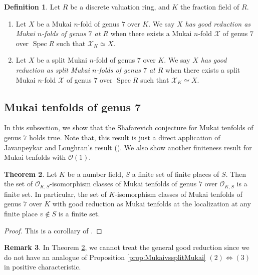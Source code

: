 \documentclass[autodetect-engine, a4paper]{amsart}
\theoremstyle{definition}
\newtheorem{thm}{Theorem}[section]
\newtheorem{rem}[thm]{Remark}
\newtheorem{defn}[thm]{Definition}
\def\cO{\mathcal{O}}
\DeclareMathOperator\Spec{\mathrm{Spec}}
\begin{document}
\begin{defn}
Let $R$ be a discrete valuation ring, and $K$ the fraction field of $R$.
\begin{enumerate}

\item 
Let $X$ be a Mukai $n$-fold of genus $7$ over $K$.
We say \emph{$X$ has good reduction as Mukai $n$-folds of genus $7$ at $R$} when there exists a Mukai $n$-fold $\mathcal{X}$ of genus $7$ over $\Spec R$ such that $\mathcal{X}_{K} \simeq X$.

\item
Let $X$ be a split Mukai $n$-fold of genus $7$ over $K$.
We say \emph{$X$ has good reduction as split Mukai $n$-folds of genus $7$ at $R$} when
there exists a split Mukai $n$-fold $\mathcal{X}$ of genus $7$ over $\Spec R$ such that $\mathcal{X}_{K} \simeq X$.

\end{enumerate}
\end{defn}



\subsection{Mukai tenfolds of genus 7}
In this subsection, we show that the Shafarevich conjecture for Mukai tenfolds of genus $7$ holds true.
Note that, this result is just a direct application of Javanpeykar and Loughran's result (\cite{Javanpeykar-Loughran:flag}).
We also show another finiteness result for Mukai tenfolds with $\cO(1)$.

\begin{thm}
\label{thm:Mukai10shaf}
Let $K$ be a number field, $S$ a finite set of finite places of $S$.
Then the set of $\cO_{K,S}$-isomorphism classes of Mukai tenfolds of genus $7$ over $\cO_{K,S}$ is a finite set.
In particular, the set of $K$-isomorphism classes of Mukai tenfolds of genus $7$ over $K$ with good reduction as Mukai tenfolds at the localization at any finite place $v \notin S$ is a finite set.
\end{thm}

\begin{proof}
This is a corollary of \cite[Theorem 3.6]{Javanpeykar-Loughran:flag}.
\end{proof}

\begin{rem}
In Theorem \ref{thm:Mukai10shaf}, we cannot treat the general good reduction since we do not have an analogue of Proposition \ref{prop:MukaivssplitMukai} $(2) \Leftrightarrow (3)$ in positive characteristic.
\end{rem}
\end{document}
